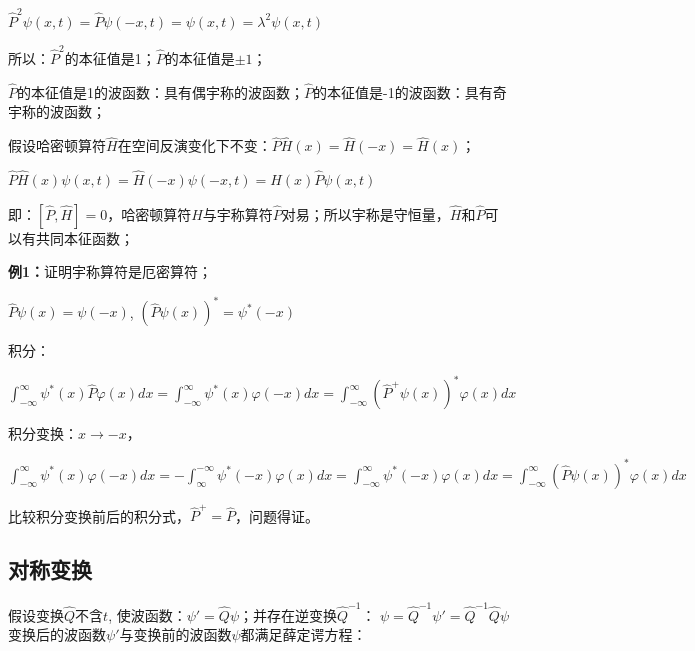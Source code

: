 
\begin{center}
$\widehat P^2 \psi \left( {x,t} \right) = \widehat P\psi \left( { - x,t} \right) = \psi \left( {x,t} \right) = \lambda ^2 \psi \left( {x,t} \right)$
\end{center}

所以：$\widehat P^2 $的本征值是1；$\hat P$的本征值是$ \pm 1$；

$\hat P$的本征值是1的波函数：具有偶宇称的波函数；$\hat P$的本征值是-1的波函数：具有奇宇称的波函数；

假设哈密顿算符$\hat H$在空间反演变化下不变：$\widehat P\widehat H(x) = \widehat H( - x) = \widehat H(x)$；

\begin{center}
$\widehat P\widehat H(x)\psi (x,t) = \widehat H( - x)\psi ( - x,t) = \widehat H(x)\widehat P\psi (x,t)$
\end{center}

即：$\left[ {\widehat P,\widehat H} \right] = 0$，哈密顿算符$\hat H$与宇称算符$\hat P$对易；所以宇称是守恒量，$\hat H$和$\hat P$可以有共同本征函数；

\textbf{例1：}证明宇称算符是厄密算符；


$\widehat P\psi (x) = \psi ( - x)$, $\left( {\widehat P\psi (x)} \right)^*  = \psi ^* ( - x)$

积分：

$\int_{ - \infty }^\infty  {\psi ^* (x)\widehat P\varphi (x)dx}  = \int_{ - \infty }^\infty  {\psi ^* (x)\varphi ( - x)dx}  = \int_{ - \infty }^\infty  {\left( {\widehat P^ +  \psi (x)} \right)^* \varphi (x)dx} $

积分变换：$x \to  - x$，

$\int_{ - \infty }^\infty  {\psi ^* (x)\varphi ( - x)dx}  =  - \int_\infty ^{ - \infty } {\psi ^* ( - x)\varphi (x)dx}  = \int_{ - \infty }^\infty  {\psi ^* ( - x)\varphi (x)dx}  = \int_{ - \infty }^\infty  {\left( {\widehat P\psi (x)} \right)^* \varphi (x)dx} $

比较积分变换前后的积分式，$\widehat P^ +   = \widehat P$，问题得证。


\subsection{对称变换}

假设变换$\hat Q$不含$t$, 使波函数：$\psi ' = \widehat Q\psi
$；并存在逆变换$\widehat Q^{ - 1} $： $\psi = \widehat Q^{ - 1} \psi
' = \widehat Q^{ - 1} \widehat Q\psi $ 变换后的波函数$\psi
'$与变换前的波函数$\psi$都满足薛定谔方程：

